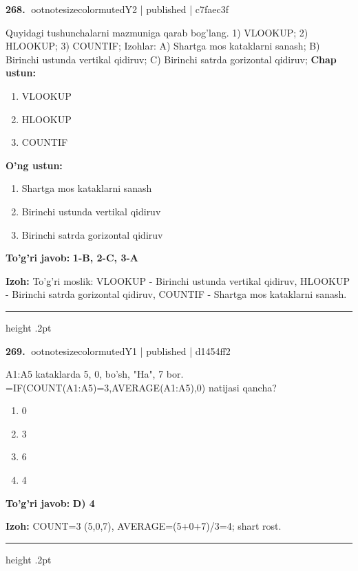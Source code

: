 \documentclass[10pt,a4paper]{article}
\begin{document}
\textbf{\color{ink}268.} {ootnotesizecolor{muted}Y2 | published | c7faec3f}
\par
Quyidagi tushunchalarni mazmuniga qarab bog'lang.  1) VLOOKUP;  2) HLOOKUP;  3) COUNTIF;  Izohlar: A) Shartga mos kataklarni sanash;  B) Birinchi ustunda vertikal qidiruv;  C) Birinchi satrda gorizontal qidiruv;
\textbf{Chap ustun:}\begin{enumerate}[label=\arabic*),leftmargin=9mm]
\item VLOOKUP
\item HLOOKUP
\item COUNTIF
\end{enumerate}
\textbf{O'ng ustun:}\begin{enumerate}[label=\Alph*),leftmargin=9mm]
\item Shartga mos kataklarni sanash
\item Birinchi ustunda vertikal qidiruv
\item Birinchi satrda gorizontal qidiruv
\end{enumerate}
\begin{tcolorbox}[enhanced,breakable,colback=teal!4,colframe=teal!55!black,boxrule=0.45pt,arc=1.2mm,left=2.8mm,right=2.8mm,top=2mm,bottom=2mm]
\textbf{\color{teal}To'g'ri javob:} \textbf{1-B, 2-C, 3-A}
\par\smallskip
\textbf{Izoh:} To'g'ri moslik: VLOOKUP - Birinchi ustunda vertikal qidiruv, HLOOKUP - Birinchi satrda gorizontal qidiruv, COUNTIF - Shartga mos kataklarni sanash.
\end{tcolorbox}
\vspace{2mm}\hrule height .2pt\vspace{2mm}

\textbf{\color{ink}269.} {ootnotesizecolor{muted}Y1 | published | d1454ff2}
\par
A1:A5 kataklarda 5, 0, bo'sh, "Ha", 7 bor. =IF(COUNT(A1:A5)=3,AVERAGE(A1:A5),0) natijasi qancha?
\begin{enumerate}[label=\Alph*),leftmargin=9mm]
\item 0
\item 3
\item 6
\item 4
\end{enumerate}
\begin{tcolorbox}[enhanced,breakable,colback=teal!4,colframe=teal!55!black,boxrule=0.45pt,arc=1.2mm,left=2.8mm,right=2.8mm,top=2mm,bottom=2mm]
\textbf{\color{teal}To'g'ri javob:} \textbf{D) 4}
\par\smallskip
\textbf{Izoh:} COUNT=3 (5,0,7), AVERAGE=(5+0+7)/3=4; shart rost.
\end{tcolorbox}
\vspace{2mm}\hrule height .2pt\vspace{2mm}
\end{document}
